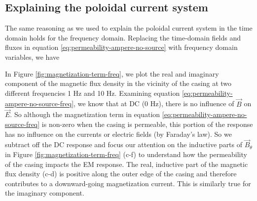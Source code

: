 \documentclass[onecolumn, extra, mreferee]{gji}
\begin{document}





\subsection{Explaining the poloidal current system}
The same reasoning as we used to explain the poloidal current system in the time domain holds for the frequency domain. Replacing the time-domain fields and fluxes in equation \ref{eq:permeability-ampere-no-source} with frequency domain variables, we have


In Figure \ref{fig:magnetization-term-freq}, we plot the real and imaginary component of the magnetic flux density in the vicinity of the casing at two different frequencies 1 Hz and 10 Hz. Examining equation \ref{eq:permeability-ampere-no-source-freq}, we know that at DC (0 Hz), there is no influence of $\vec{B}$ on $\vec{E}$. So although the magnetization term in equation \ref{eq:permeability-ampere-no-source-freq} is non-zero when the casing is permeable, this portion of the response has no influence on the currents or electric fields (by Faraday's law). So we subtract off the DC response and focus our attention on the inductive parts of $\vec{B}_\theta$ in Figure \ref{fig:magnetization-term-freq} (c-f) to understand how the permeability of the casing impacts the EM response. The real, inductive part of the magnetic flux density (c-d) is positive along the outer edge of the casing and therefore contributes to a downward-going magnetization current. This is similarly true for the imaginary component.



\end{document}
